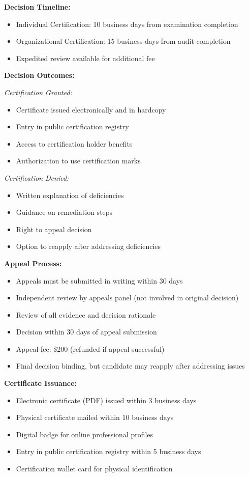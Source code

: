 \documentclass[11pt,a4paper]{article}
\begin{document}
\textbf{Decision Timeline:}
\begin{itemize}
\item Individual Certification: 10 business days from examination completion
\item Organizational Certification: 15 business days from audit completion
\item Expedited review available for additional fee
\end{itemize}

\textbf{Decision Outcomes:}

\textit{Certification Granted:}
\begin{itemize}
\item Certificate issued electronically and in hardcopy
\item Entry in public certification registry
\item Access to certification holder benefits
\item Authorization to use certification marks
\end{itemize}

\textit{Certification Denied:}
\begin{itemize}
\item Written explanation of deficiencies
\item Guidance on remediation steps
\item Right to appeal decision
\item Option to reapply after addressing deficiencies
\end{itemize}

\textbf{Appeal Process:}
\begin{itemize}
\item Appeals must be submitted in writing within 30 days
\item Independent review by appeals panel (not involved in original decision)
\item Review of all evidence and decision rationale
\item Decision within 30 days of appeal submission
\item Appeal fee: \$200 (refunded if appeal successful)
\item Final decision binding, but candidate may reapply after addressing issues
\end{itemize}

\textbf{Certificate Issuance:}
\begin{itemize}
\item Electronic certificate (PDF) issued within 3 business days
\item Physical certificate mailed within 10 business days
\item Digital badge for online professional profiles
\item Entry in public certification registry within 5 business days
\item Certification wallet card for physical identification
\end{itemize}
\end{document}

